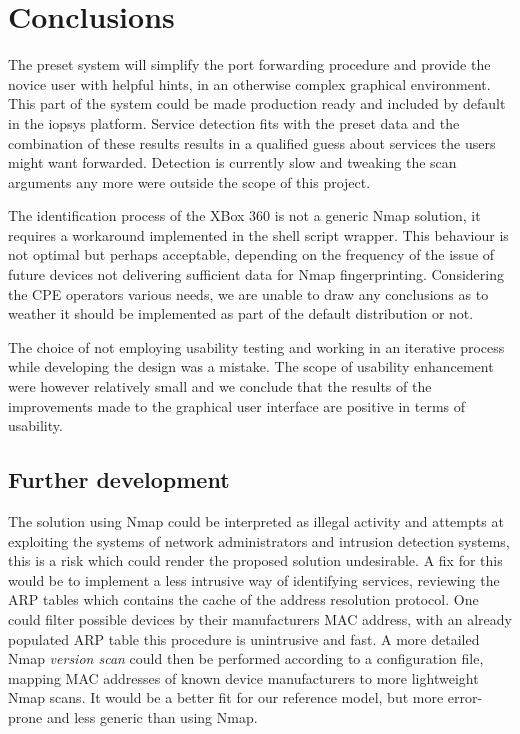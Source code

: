 \documentclass[a4paper,11pt,makeidx]{kth-bcs}
\begin{document}
\chapter{Conclusions}

The preset system will simplify the port forwarding procedure and provide the novice user with helpful hints, in an otherwise complex graphical environment.
This part of the system could be made production ready and included by default in the iopsys platform.
Service detection fits with the preset data and the combination of these results results in a qualified guess about services the users might want forwarded.
Detection is currently slow and tweaking the scan arguments any more were outside the scope of this project.

The identification process of the XBox 360 is not a generic Nmap solution, it requires a workaround implemented in the shell script wrapper.
This behaviour is not optimal but perhaps acceptable, depending on the frequency of the issue of future devices not delivering sufficient data for Nmap fingerprinting.
Considering the CPE operators various needs, we are unable to draw any conclusions as to weather it should be implemented as part of the default distribution or not.

The choice of not employing usability testing and working in an iterative process while developing the design was a mistake.
The scope of usability enhancement were however relatively small and we conclude that the results of the improvements made to the graphical user interface are positive in terms of usability.

\newpage
\section{Further development}
The solution using Nmap could be interpreted as illegal activity and attempts at exploiting the systems of network administrators and intrusion detection systems, this is a risk which could render the proposed solution undesirable.
A fix for this would be to implement a less intrusive way of identifying services, reviewing the ARP tables which contains the cache of the address resolution protocol.
One could filter possible devices by their manufacturers MAC address, with an already populated ARP table this procedure is unintrusive and fast.
A more detailed Nmap \emph{version scan} could then be performed according to a configuration file, mapping MAC addresses of known device manufacturers to more lightweight Nmap scans.
It would be a better fit for our reference model, but more error-prone and less generic than using Nmap.
\end{document}
